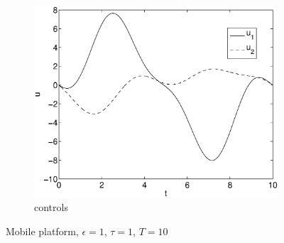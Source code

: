 \begin{figure}[h]
\begin{subfigure}[b]{\textwidth}
\centering
\includegraphics[height=0.3\textheight]{img/final_1_1_10_u.eps}
\caption{controls}
\end{subfigure}
\caption{Mobile platform, $\epsilon=1$, $\tau=1$, $T=10$}
\label{fig:pl7}
\end{figure}

